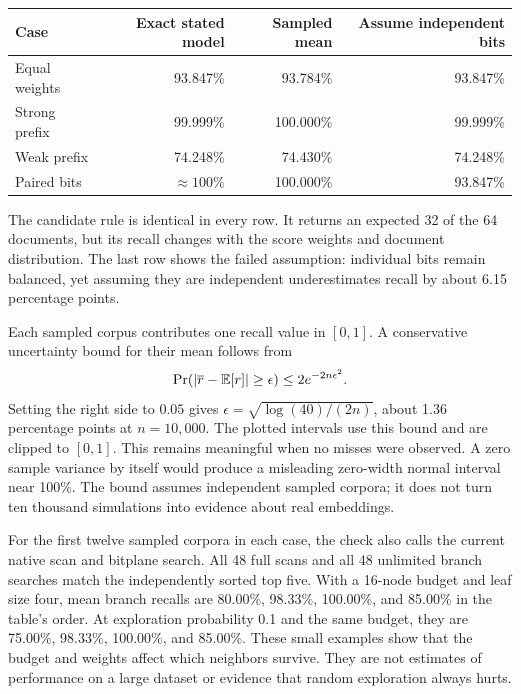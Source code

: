 \begin{center}\small
\begin{tabular}{@{}lrrr@{}}
\toprule
Case & Exact stated model & Sampled mean & Assume independent bits\\\midrule
Equal weights & 93.847\% & 93.784\% & 93.847\%\\
Strong prefix & 99.999\% & 100.000\% & 99.999\%\\
Weak prefix & 74.248\% & 74.430\% & 74.248\%\\
Paired bits & $\approx100\%$ & 100.000\% & 93.847\%\\\bottomrule
\end{tabular}\normalsize
\end{center}
The candidate rule is identical in every row. It returns an expected 32 of the 64 documents,
but its recall changes with the score weights and document distribution. The last row shows
the failed assumption: individual bits remain balanced, yet assuming they are independent
underestimates recall by about 6.15 percentage points.


Each sampled corpus contributes one recall value in $[0,1]$. A conservative uncertainty bound
for their mean follows from
\[
\Pr(|\overline r-\mathbb E[r]|\ge\epsilon)\le2e^{-2n\epsilon^2}.
\]
Setting the right side to $0.05$ gives
$\epsilon=\sqrt{\log(40)/(2n)}$, about 1.36 percentage points at $n=10{,}000$.
The plotted intervals use this bound and are clipped to $[0,1]$. This remains meaningful when
no misses were observed. A zero sample variance by itself would produce a misleading zero-width
normal interval near 100\%. The bound assumes independent sampled corpora; it does not turn
ten thousand simulations into evidence about real embeddings.

For the first twelve sampled corpora in each case, the check also calls the current native
scan and bitplane search. All 48 full scans and all 48 unlimited branch searches match the
independently sorted top five. With a 16-node budget and leaf size four, mean branch recalls
are 80.00\%, 98.33\%, 100.00\%, and 85.00\% in the table's order. At exploration probability
0.1 and the same budget, they are 75.00\%, 98.33\%, 100.00\%, and 85.00\%. These small examples
show that the budget and weights affect which neighbors survive. They are not estimates of
performance on a large dataset or evidence that random exploration always hurts.

